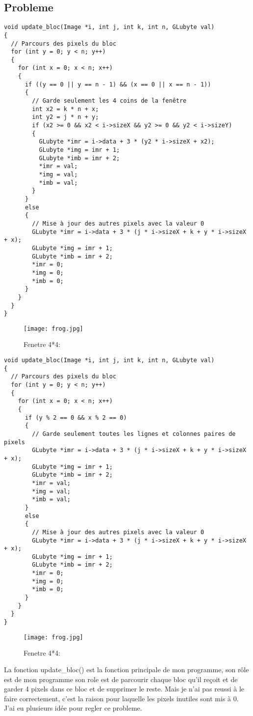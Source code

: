 \documentclass{article}
\begin{document}
\subsection{Probleme}
\begin{verbatim}
void update_bloc(Image *i, int j, int k, int n, GLubyte val)
{
  // Parcours des pixels du bloc
  for (int y = 0; y < n; y++)
  {
    for (int x = 0; x < n; x++)
    {
      if ((y == 0 || y == n - 1) && (x == 0 || x == n - 1))
      {
        // Garde seulement les 4 coins de la fenêtre
        int x2 = k * n + x;
        int y2 = j * n + y;
        if (x2 >= 0 && x2 < i->sizeX && y2 >= 0 && y2 < i->sizeY)
        {
          GLubyte *imr = i->data + 3 * (y2 * i->sizeX + x2);
          GLubyte *img = imr + 1;
          GLubyte *imb = imr + 2;
          *imr = val;
          *img = val;
          *imb = val;
        }
      }
      else
      {
        // Mise à jour des autres pixels avec la valeur 0
        GLubyte *imr = i->data + 3 * (j * i->sizeX + k + y * i->sizeX + x);
        GLubyte *img = imr + 1;
        GLubyte *imb = imr + 2;
        *imr = 0;
        *img = 0;
        *imb = 0;
      }
    }
  }
}

\end{verbatim}

 \begin{figure}
 \centering
 \texttt{[image: frog.jpg]}
 \caption{\label{fig:4}Fenetre 4*4:}
 \end{figure}
 
\begin{verbatim}
void update_bloc(Image *i, int j, int k, int n, GLubyte val)
{
  // Parcours des pixels du bloc
  for (int y = 0; y < n; y++)
  {
    for (int x = 0; x < n; x++)
    {
      if (y % 2 == 0 && x % 2 == 0)
      {
        // Garde seulement toutes les lignes et colonnes paires de pixels
        GLubyte *imr = i->data + 3 * (j * i->sizeX + k + y * i->sizeX + x);
        GLubyte *img = imr + 1;
        GLubyte *imb = imr + 2;
        *imr = val;
        *img = val;
        *imb = val;
      }
      else
      {
        // Mise à jour des autres pixels avec la valeur 0
        GLubyte *imr = i->data + 3 * (j * i->sizeX + k + y * i->sizeX + x);
        GLubyte *img = imr + 1;
        GLubyte *imb = imr + 2;
        *imr = 0;
        *img = 0;
        *imb = 0;
      }
    }
  }
}
\end{verbatim}
 \begin{figure}
 \centering
 \texttt{[image: frog.jpg]}
 \caption{\label{fig:4}Fenetre 4*4:}
 \end{figure}
La fonction update_bloc() est la fonction principale de mon programme, son rôle est de mon programme son role est de parcourir chaque bloc qu'il reçoit et de garder 4 pixels dans ce bloc et de supprimer le reste. Mais je n'ai pas reussi à le faire correctement, c'est la raison pour laquelle les pixels inutiles sont mis à 0. J'ai eu plusieurs idée pour regler ce probleme. \\ 
\end{document}
